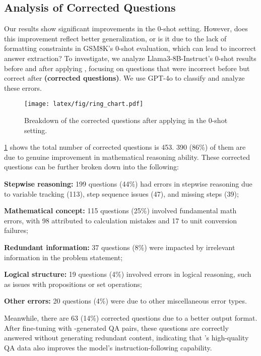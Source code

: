\subsection{Analysis of Corrected Questions}\label{sec:0shotcase}

Our results show significant improvements in the 0-shot setting. However, does this improvement reflect better generalization, or is it due to the lack of formatting constraints in GSM8K's 0-shot evaluation, which can lead to incorrect answer extraction? To investigate, we analyze Llama3-8B-Instruct's 0-shot results before and after applying {\langname}, focusing on questions that were incorrect before but correct after \textbf{(corrected questions)}. We use GPT-4o to classify and analyze these errors.

\begin{figure}[t]
  \centering
  \texttt{[image: latex/fig/ring\_chart.pdf]}
  \caption{Breakdown of the corrected questions after applying {\langname} in the 0-shot setting.}
  \label{fig:0shot_case}
\end{figure}

\cref{fig:0shot_case} shows the total number of corrected questions is 453. 390 (86\%) of them are due to genuine improvement in mathematical reasoning ability. These corrected questions can be further broken down into the following:
\begin{enumerate*}[label=(\roman*)]
    \item \textbf{Stepwise reasoning:} 199 questions (44\%) had errors in stepwise reasoning due to variable tracking (113), step sequence issues (47), and missing steps (39);
    \item \textbf{Mathematical concept:} 115 questions (25\%) involved fundamental math errors, with 98 attributed to calculation mistakes and 17 to unit conversion failures;
    \item \textbf{Redundant information:} 37 questions (8\%) were impacted by irrelevant information in the problem statement;
    \item \textbf{Logical structure:} 19 questions (4\%) involved errors in logical reasoning, such as issues with propositions or set operations;
    \item \textbf{Other errors:} 20 questions (4\%) were due to other miscellaneous error types.
\end{enumerate*}

Meanwhile, there are 63 (14\%) corrected questions due to a better output format. After fine-tuning with {\langname}-generated QA pairs, these questions are correctly answered without generating redundant content, indicating that {\langname}'s high-quality QA data also improves the model's instruction-following capability. 

